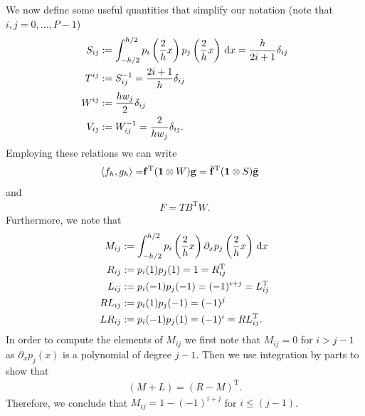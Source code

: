 We now define some useful quantities that simplify our notation (note that $i,j=0,\dots,P-1$) 
\begin{subequations}
    \begin{align}
        S_{ij} &:= \int_{-h/2}^{h/2} p_i\left(\frac{2}{h} x\right)p_j\left(\frac{2}{h} x\right) \dx = \frac{h}{2i+1}\delta_{ij} \\%
        T^{ij} &:= S^{-1}_{ij} = \frac{2i+1}{h}\delta_{ij} \\%
        W^{ij} &:= \frac{h w_j}{2}\delta_{ij}\\
        V_{ij} &:= W_{ij}^{-1} = \frac{2}{hw_j}\delta_{ij}. 
    \end{align}
    \label{eq:diagonal}
\end{subequations}
Employing these relations we can write
    \begin{align}
		\langle f_h,g_h\rangle =& {\mathbf{f}}^{\mathrm{T}}(\mathbf{1}\otimes W){\mathbf{g}} 
		= \bar{{\mathbf{f}}}^{\mathrm{T}}(\mathbf{1}\otimes S)\bar{{\mathbf{g}}} 
    \end{align}
    and \begin{align}
        F = TB^{\mathrm{T}}W.
        \label{eq:transformation}
    \end{align}
Furthermore, we note that
\begin{subequations}
    \begin{align}
        M_{ij} &:= \int_{-h/2}^{h/2} p_i\left(\frac{2}{h} x\right)\partial_xp_j\left(\frac{2}{h} x\right) \,\mathrm{d}x\\
		R_{ij} &:= p_i(1)p_j(1) = 1 = R^{\mathrm{T}}_{ij}\\
		L_{ij} &:= p_i(-1)p_j(-1) = (-1)^{i+j} = L^{\mathrm{T}}_{ij}\\
        RL_{ij}&:= p_i(1)p_j(-1) = (-1)^j\\
		LR_{ij}&:= p_i(-1)p_j(1) = (-1)^i = RL^{\mathrm{T}}_{ij}.
    \end{align}
    \label{eq:legendre_operators}
\end{subequations}
In order to compute the elements of $M_{ij}$ we first note that $M_{ij} = 0$ for
$i > j-1$ as $\partial_x p_j(x)$ is a polynomial of degree $j-1$. Then
we use integration by parts to show that 
\begin{align}
	(M+L) = (R-M)^{\mathrm{T}}.
    \label{eq:legendre_derivative}
\end{align}
Therefore, we conclude that $M_{ij} = 1 - (-1)^{i+j}$ for $i\le (j-1)$. 

